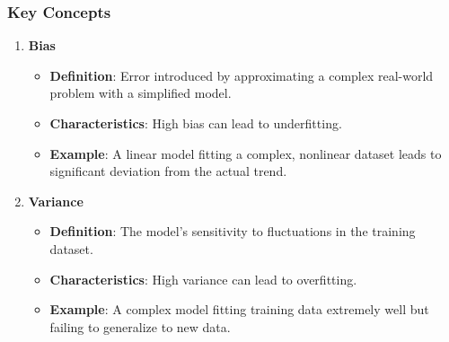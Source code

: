 \documentclass[aspectratio=169]{beamer}
\begin{document}
\begin{frame}[fragile]
    \frametitle{Key Concepts}
    \begin{enumerate}
        \item \textbf{Bias}
        \begin{itemize}
            \item \textbf{Definition}: Error introduced by approximating a complex real-world problem with a simplified model.
            \item \textbf{Characteristics}: High bias can lead to underfitting.
            \item \textbf{Example}: A linear model fitting a complex, nonlinear dataset leads to significant deviation from the actual trend.
        \end{itemize}

        \item \textbf{Variance}
        \begin{itemize}
            \item \textbf{Definition}: The model's sensitivity to fluctuations in the training dataset.
            \item \textbf{Characteristics}: High variance can lead to overfitting.
            \item \textbf{Example}: A complex model fitting training data extremely well but failing to generalize to new data.
        \end{itemize}
    \end{enumerate}
\end{frame}
\end{document}
